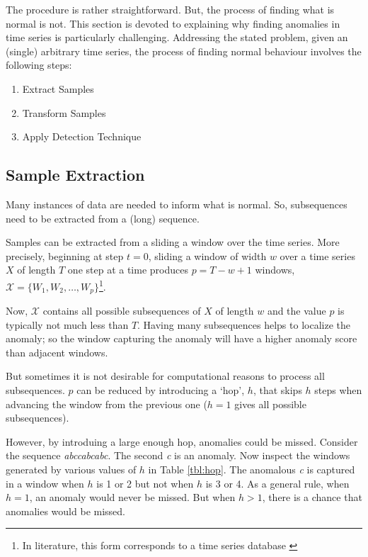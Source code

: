 The procedure is rather straightforward. But, the process of finding what is normal is not. This section is devoted to explaining why finding anomalies in time series is particularly challenging. Addressing the stated problem, given an (single) arbitrary time series, the process of finding normal behaviour involves the following steps:
\begin{enumerate}
\item Extract Samples
\item Transform Samples
\item Apply Detection Technique
\end{enumerate}

\subsection{Sample Extraction}
\label{sec:adsample}

Many instances of data are needed to inform what is normal. So, subsequences need to be extracted from a (long) sequence.

Samples can be extracted from a sliding a window over the time series. More precisely, beginning at step $t=0$, sliding a window of width $w$ over a time series $X$ of length $T$ one step at a time produces $p=T-w+1$ windows, $\mathcal{X}=\{W_1,W_2,\ldots,W_p\}$\footnote{In literature, this form corresponds to a time series database \cite{Gupta2013}}.

Now, $\mathcal{X}$ contains all possible subsequences of $X$ of length $w$ and the value $p$ is typically not much less than $T$. Having many subsequences helps to localize the anomaly; so the window capturing the anomaly will have a higher anomaly score than adjacent windows.

But sometimes it is not desirable for computational reasons to process all subsequences. $p$ can be reduced by introducing a `hop', $h$, that skips $h$ steps when advancing the window from the previous one ($h=1$ gives all possible subsequences). 

However, by introduing a large enough hop, anomalies could be missed. Consider the sequence \emph{abccabcabc}. The second \emph{c} is an anomaly. Now inspect the windows generated by various values of $h$ in Table \ref{tbl:hop}. The anomalous \emph{c} is captured in a window when $h$ is 1 or 2 but not when $h$ is 3 or 4. As a general rule, when $h=1$, an anomaly would never be missed. But when $h>1$, there is a chance that anomalies would be missed.

